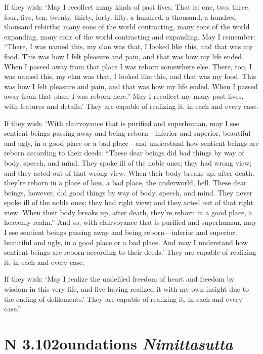 \documentclass[12pt,openany]{book}%
\newcommand*{\suttatitleacronym}[1]{\smaller[2]{#1}\vspace*{.3em}}
\newcommand*{\suttatitletranslation}[1]{\linebreak{#1}}
\newcommand*{\suttatitleroot}[1]{\linebreak\smaller[2]\itshape{#1}}
\newcommand*{\tocacronym}[1]{\hspace*{-3.3em}{#1}\quad}
\newcommand*{\toctranslation}[1]{#1}
\newcommand*{\tocroot}[1]{(\textit{#1})}
\begin{document}
If they wish: ‘May I recollect many kinds of past lives. That is: one, two, three, four, five, ten, twenty, thirty, forty, fifty, a hundred, a thousand, a hundred thousand rebirths; many eons of the world contracting, many eons of the world expanding, many eons of the world contracting and expanding. May I remember: “There, I was named this, my clan was that, I looked like this, and that was my food. This was how I felt pleasure and pain, and that was how my life ended. When I passed away from that place I was reborn somewhere else. There, too, I was named this, my clan was that, I looked like this, and that was my food. This was how I felt pleasure and pain, and that was how my life ended. When I passed away from that place I was reborn here.” May I recollect my many past lives, with features and details.’ They are capable of realizing it, in each and every case. 

If they wish: ‘With clairvoyance that is purified and superhuman, may I see sentient beings passing away and being reborn—inferior and superior, beautiful and ugly, in a good place or a bad place—and understand how sentient beings are reborn according to their deeds: “These dear beings did bad things by way of body, speech, and mind. They spoke ill of the noble ones; they had wrong view; and they acted out of that wrong view. When their body breaks up, after death, they’re reborn in a place of loss, a bad place, the underworld, hell. These dear beings, however, did good things by way of body, speech, and mind. They never spoke ill of the noble ones; they had right view; and they acted out of that right view. When their body breaks up, after death, they’re reborn in a good place, a heavenly realm.” And so, with clairvoyance that is purified and superhuman, may I see sentient beings passing away and being reborn—inferior and superior, beautiful and ugly, in a good place or a bad place. And may I understand how sentient beings are reborn according to their deeds.’ They are capable of realizing it, in each and every case. 

If they wish: ‘May I realize the undefiled freedom of heart and freedom by wisdom in this very life, and live having realized it with my own insight due to the ending of defilements.’ They are capable of realizing it, in each and every case.” 

%
\section*{{\suttatitleacronym AN 3.102}{\suttatitletranslation Foundations }{\suttatitleroot Nimittasutta}}
\addcontentsline{toc}{section}{\tocacronym{AN 3.102} \toctranslation{Foundations } \tocroot{Nimittasutta}}
\end{document}
